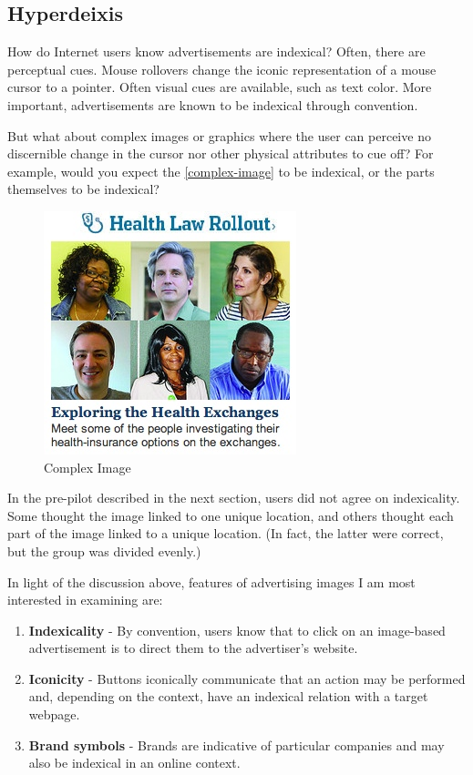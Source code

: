 \subsection{Hyperdeixis}
\label{hyperdeixis}

How do Internet users know advertisements are indexical? Often, there are perceptual cues. Mouse rollovers change the iconic representation of a mouse cursor to a pointer. Often visual cues are available, such as text color. More important, advertisements are known to be indexical through convention. 

But what about complex images or graphics where the user can perceive no discernible change in the cursor nor other physical attributes to cue off? For example, would you expect the  \autoref{complex-image}  to be indexical, or the parts themselves to be indexical?


\begin{figure}
\centerline{
 \includegraphics[scale=.5]{chapter6.tex/multipart-image}
}
\caption{Complex Image}
\label{complex-image}
\end{figure}


In the pre-pilot described in the next section, users did not agree on indexicality. Some thought the image linked to one unique location, and others thought each part of the image linked to a unique location. (In fact, the latter were correct, but the group was divided evenly.)

In light of the discussion above, features of advertising images I am most interested in examining are:

\begin{enumerate}
\item \textbf{Indexicality} - By convention, users know that to click on an image-based advertisement is to direct them to the advertiser's website. 
\item \textbf{Iconicity} - Buttons iconically communicate that an action may be performed and, depending on the context, have an indexical relation with a target webpage.
\item \textbf{Brand symbols} - Brands are indicative of particular companies and may also be indexical in an online context.
\end{enumerate}

